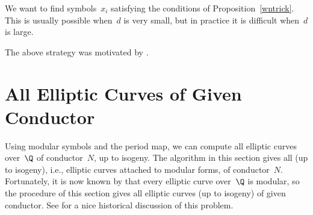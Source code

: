\begin{remark}
We want to find symbols~$x_i$ satisfying the
conditions of Proposition~\ref{wntrick}.  This is usually possible
when~$d$ is very small, but in practice it is difficult  when~$d$ is large. 
\end{remark}

\begin{remark}
The above strategy was motivated by
\cite[\S2.10]{cremona:algs}.
\end{remark}






\section{All Elliptic Curves of Given Conductor}\label{sec:findall}
\label{sec:ecmodsym}
Using modular symbols and the period map, we can compute all elliptic
curves over~$\Q$ of conductor~$N$, up to isogeny.  The algorithm in
this section gives all  (up to isogeny),
i.e., elliptic curves attached to modular forms, of conductor~$N$.
Fortunately, it is now known by \cite{wiles:fermat,
  breuil-conrad-diamond-taylor, taylor-wiles:fermat} that every
elliptic curve over~$\Q$ is modular, so the procedure of this section
gives all elliptic curves (up to isogeny) of given conductor.  See
\cite{cremona:history} for a nice historical discussion of this
problem.

